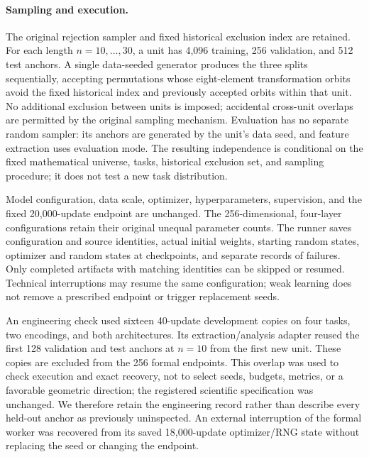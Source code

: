 \paragraph{Sampling and execution.}
The original rejection sampler and fixed historical exclusion index are
retained. For each length $n=10,\ldots,30$, a unit has 4,096 training,
256 validation, and 512 test anchors. A single data-seeded generator produces
the three splits sequentially, accepting permutations whose eight-element
transformation orbits avoid the fixed historical index and previously
accepted orbits within that unit. No additional exclusion between units is
imposed; accidental cross-unit overlaps are permitted by the original
sampling mechanism. Evaluation has no separate random sampler: its anchors
are generated by the unit's data seed, and feature extraction uses evaluation
mode. The resulting independence is conditional on the fixed mathematical
universe, tasks, historical exclusion set, and sampling procedure; it does
not test a new task distribution.

Model configuration, data scale, optimizer, hyperparameters, supervision,
and the fixed 20,000-update endpoint are unchanged. The 256-dimensional,
four-layer configurations retain their original unequal parameter counts.
The runner saves configuration and source identities, actual initial
weights, starting random states, optimizer and random states at checkpoints,
and separate records of failures. Only completed artifacts with matching
identities can be skipped or resumed. Technical interruptions may resume
the same configuration; weak learning does not remove a prescribed
endpoint or trigger replacement seeds.

An engineering check used sixteen 40-update development copies on four
tasks, two encodings, and both architectures. Its extraction/analysis
adapter reused the first 128 validation and test anchors at $n=10$ from
the first new unit. These copies are excluded from the 256 formal
endpoints. This overlap was used to check execution and exact recovery,
not to select seeds, budgets, metrics, or a favorable geometric direction;
the registered scientific specification was unchanged. We therefore
retain the engineering record rather than describe every held-out anchor
as previously uninspected. An external interruption of the formal worker
was recovered from its saved 18,000-update optimizer/RNG state without
replacing the seed or changing the endpoint.

